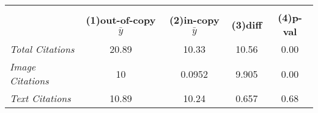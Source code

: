 {
\def\sym#1{\ifmmode^{#1}\else\(^{#1}\)\fi}
\begin{tabular}{l*{1}{cccc}}
\toprule
                    &\multicolumn{4}{c}{}                               \\
                    &\textbf{(1)out-of-copy $\bar{y}$}&\textbf{(2)in-copy $\bar{y}$}&\textbf{(3)diff}&\textbf{(4)p-val}\\
\midrule
\emph{Total Citations}&       20.89&       10.33&       10.56&        0.00\\
\emph{Image Citations}&          10&      0.0952&       9.905&        0.00\\
\emph{Text Citations}&       10.89&       10.24&       0.657&        0.68\\
\bottomrule
\end{tabular}
}
